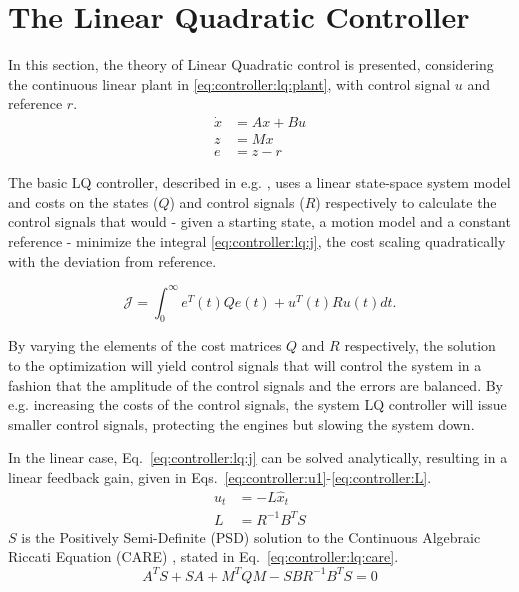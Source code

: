 \section{The Linear Quadratic Controller}
\label{sec:controller:lq}
    In this section, the theory of Linear Quadratic control is presented,
    considering the continuous linear plant in \eqref{eq:controller:lq:plant},
    with control signal $u$ and reference $r$.
    \begin{subequations}
        \label{eq:controller:lq:plant}
        \begin{align}
            \dot{x} &= Ax + Bu \\
%
            z &= Mx \\
%
            e &= z - r
        \end{align}
    \end{subequations}

    The basic LQ controller, described in e.g. \citep{glad2003reglerteori},
    uses a linear state-space system model and costs on the states ($Q$) and control
    signals ($R$) respectively to calculate the control signals that would
    - given a starting state, a motion model and a constant reference -
    minimize the integral \eqref{eq:controller:lq:j}, the cost
    scaling quadratically with the deviation from reference.

    \begin{equation}
    \label{eq:controller:lq:j}
        \mathcal{J} = \int_{0}^{\infty} e^{T}(t)Qe(t) + u^{T}(t)Ru(t) dt.
    \end{equation}

    By varying the elements of the cost matrices $Q$ and $R$
    respectively, the solution to the optimization will yield control
    signals that will control the system in a fashion that the amplitude
    of the control signals and the errors are balanced.
    By e.g. increasing the costs of the control signals, the system
    LQ controller will issue smaller control signals, protecting the
    engines but slowing the system down.

    In the linear case, Eq.~\eqref{eq:controller:lq:j} can be solved analytically,
    resulting in a linear feedback gain, given in Eqs.~\eqref{eq:controller:u1}-\eqref{eq:controller:L}.
    \begin{align}
        u_{t} &= -L\hat{x}_{t} \label{eq:controller:u1} \\
%
        L &= R^{-1}B^{T}S \label{eq:controller:L}
    \end{align}
    $S$ is the Positively Semi-Definite (PSD) solution to the
    Continuous Algebraic Riccati Equation (CARE) \citep{glad2003reglerteori},
    stated in Eq.~\eqref{eq:controller:lq:care}.
    \begin{equation}
        \label{eq:controller:lq:care}
        A^{T}S + SA + M^{T}QM - SBR^{-1}B^{T}S = 0
    \end{equation}

